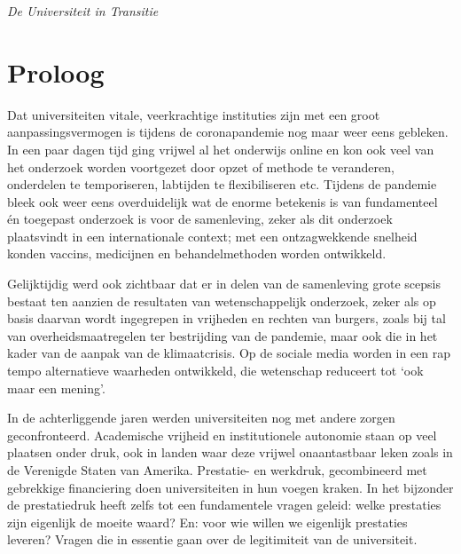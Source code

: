 \documentclass[smallauthor, chapterhaspagenum, nochapterinheader, pagenuminheader,  bigchapnum,medium2, tocpages, garamond, titleinheader]{jote-book}
\begin{document}
	
\frontmatter
\pagestyle{empty}
\begin{center}
  \vfill
  \emph{De Universiteit in Transitie}
  \vfill
\end{center}
\clearpage
\clearpage
\copyrightpage
\clearpage
\titlepage

\cleartorecto
\pagestyle{empty}
\tableofcontents



\cleartoverso
\mainmatter

\pagestyle{ruled}

	\chapter*{ Proloog }

	\nochapterinheader



	Dat universiteiten vitale, veerkrachtige instituties zijn met een groot aanpassingsvermogen is tijdens de coronapandemie nog maar weer eens gebleken. In een paar dagen tijd ging vrijwel al het onderwijs online en kon ook veel van het onderzoek worden voortgezet door opzet of methode te veranderen, onderdelen te temporiseren, labtijden te flexibiliseren etc. Tijdens de pandemie bleek ook weer eens overduidelijk wat de enorme betekenis is van fundamenteel én toegepast onderzoek is voor de samenleving, zeker als dit onderzoek plaatsvindt in een internationale context; met een ontzagwekkende snelheid konden vaccins, medicijnen en behandelmethoden worden ontwikkeld.



	Gelijktijdig werd ook zichtbaar dat er in delen van de samenleving grote scepsis bestaat ten aanzien de resultaten van wetenschappelijk onderzoek, zeker als op basis daarvan wordt ingegrepen in vrijheden en rechten van burgers, zoals bij tal van overheidsmaatregelen ter bestrijding van de pandemie, maar ook die in het kader van de aanpak van de klimaatcrisis. Op de sociale media worden in een rap tempo alternatieve waarheden ontwikkeld, die wetenschap reduceert tot ‘ook maar een mening'.



	In de achterliggende jaren werden universiteiten nog met andere zorgen geconfronteerd. Academische vrijheid en institutionele autonomie staan op veel plaatsen onder druk, ook in landen waar deze vrijwel onaantastbaar leken zoals in de Verenigde Staten van Amerika. Prestatie- en werkdruk, gecombineerd met gebrekkige financiering doen universiteiten in hun voegen kraken. In het bijzonder de prestatiedruk heeft zelfs tot een fundamentele vragen geleid: welke prestaties zijn eigenlijk de moeite waard? En: voor wie willen we eigenlijk prestaties leveren? Vragen die in essentie gaan over de legitimiteit van de universiteit.
\end{document}

